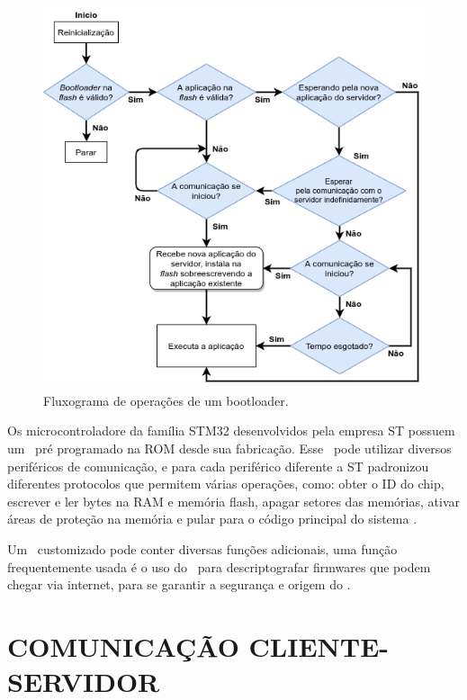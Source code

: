 \begin{figure}[H]
    \scriptsize
     \centering
     \includegraphics[scale=0.8]{dados/figuras/FluxoBootloader.png}
     \caption{Fluxograma de operações de um bootloader.}
     \label{FluxoBootloader}
\end{figure}



Os microcontroladore da família STM32 desenvolvidos pela empresa ST  possuem um \bootloader\ pré programado na ROM desde sua fabricação. Esse \bootloader\ pode utilizar diversos periféricos de comunicação, e para cada periférico diferente a ST padronizou diferentes protocolos que permitem várias operações, como: obter o ID do chip, escrever e ler bytes na RAM e memória flash, apagar setores das memórias, ativar áreas de proteção na memória e pular para o código principal do sistema \cite{Noviello2018}.

Um \bootloader\ customizado pode conter diversas funções adicionais, uma função frequentemente usada é o uso do \bootloader\ para descriptografar firmwares que podem chegar via internet, para se garantir a segurança e origem do \firmware.




\section {COMUNICAÇÃO CLIENTE-SERVIDOR}


